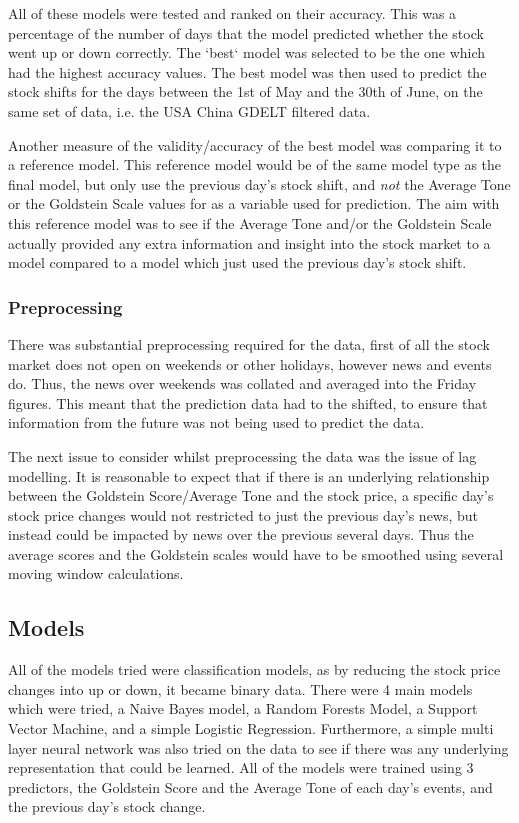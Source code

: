 All of these models were tested and ranked on their accuracy. This was a percentage of the number of days that the model predicted whether the stock went up or down correctly. The `best` model was selected to be the one which had the highest accuracy values. The best model was then used to predict the stock shifts for the days between the 1st of May and the 30th of June, on the same set of data, i.e. the USA China GDELT filtered data. 

Another measure of the validity/accuracy of the best model was comparing it to a reference model. This reference model would be of the same model type as the final model, but only use the previous day's stock shift, and \textit{not} the Average Tone or the Goldstein Scale values for as a variable used for prediction. The aim with this reference model was to see if the Average Tone and/or the Goldstein Scale actually provided any extra information and insight into the stock market to a model compared to a model which just used the previous day's stock shift.  

\subsubsection{Preprocessing}
There was substantial preprocessing required for the data, first of all the stock market does not open on weekends or other holidays, however news and events do. Thus, the news over weekends was collated and averaged into the Friday figures. This meant that the prediction data had to the shifted, to ensure that information from the future was not being used to predict the data.

The next issue to consider whilst preprocessing the data was the issue of lag modelling. It is reasonable to expect that if there is an underlying relationship between the Goldstein Score/Average Tone and the stock price, a specific day's stock price changes would not restricted to just the previous day's news, but instead could be impacted by news over the previous several days. Thus the average scores and the Goldstein scales would have to be smoothed using several moving window calculations.

\subsection{Models}
\label{models}
All of the models tried were classification models, as by reducing the stock price changes into up or down, it became binary data. There were 4 main models which were tried, a Naive Bayes model, a Random Forests Model, a Support Vector Machine, and a simple Logistic Regression. Furthermore, a simple multi layer neural network was also tried on the data to see if there was any underlying representation that could be learned. All of the models were trained using 3 predictors, the Goldstein Score and the Average Tone of each day's events, and the previous day's stock change. 

